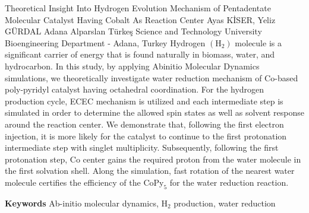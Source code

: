
    \begin{abstract_online}{Theoretical Insight Into Hydrogen Evolution Mechanism of Pentadentate Molecular Catalyst Having Cobalt As Reaction Center}{%
        Ayas KİSER, Yeliz GÜRDAL}{%
        }{%
        Adana Alparslan Türkeş Science and Technology University Bioengineering Department - Adana, Turkey}
    Hydrogen $\left(\mathrm{H}_{2}\right)$ molecule is a significant carrier of energy that is found naturally in biomass, water, and hydrocarbon. In this study, by applying Abinitio Molecular Dynamics simulations, we theoretically investigate water reduction mechanism of Co-based poly-pyridyl catalyst having octahedral coordination. For the hydrogen production cycle, ECEC mechanism is utilized and each intermediate step is simulated in order to determine the allowed spin states as well as solvent response around the reaction center. We demonstrate that, following the first electron injection, it is more likely for the catalyst to continue to the first protonation intermediate step with singlet multiplicity. Subsequently, following the first protonation step, Co center gains the required proton from the water molecule in the first solvation shell. Along the simulation, fast rotation of the nearest water molecule certifies the efficiency of the $\mathrm{CoPy}_{5}$ for the water reduction reaction. 
    
        \textbf{Keywords} \newline{}Ab-initio molecular dynamics, $\mathrm{H}_{2}$ production, water reduction
    \end{abstract_online}
    